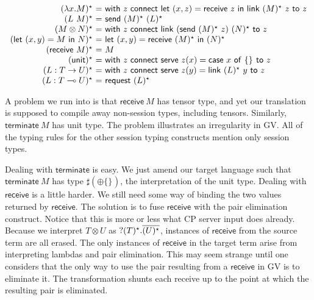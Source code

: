 \documentclass{easychair}
\makeatletter
\newcommand{\ba}{\begin{array}}
\newcommand{\ea}{\end{array}}
\newenvironment{equations}{\[\ba{@{}r@{~}c@{~}l@{}}}{\ea\]}
\newcommand{\key}{\mathsf}
\newcommand{\set}[1]{\{ #1 \}}
\newcommand{\row}[2]{\set{#1}_{#2}}
\newcommand{\gvInput}[2]{\mathord{?}{#1}.{#2}}
\newcommand{\gvPlus}[2]{\oplus \row{#1}{#2}}
\newcommand{\gvService}[1]{\sharp {#1}}
\newcommand{\gvDual}[1]{\overline{#1}}
\newcommand{\lolli}{\multimap}
\newcommand{\gvLinFun}[2]{{#1} \lolli {#2}}
\newcommand{\gvUnFun}[2]{{#1} \to {#2}}
\newcommand{\gvTimes}[2]{{#1} \otimes {#2}}
\newcommand{\gvUnit}{\key{unit}}
\newcommand{\gvLink}[2]{\key{link}~{#1}~{#2}}
\newcommand{\gvLam}[2]{\lambda {#1}.{#2}}
\newcommand{\gvApp}[2]{{#1}~{#2}}
\newcommand{\gvPair}[2]{({#1},{#2})}
\newcommand{\gvLet}[3]{\key{let}~{#1}={#2}~\key{in}~{#3}}
\newcommand{\gvSend}[2]{\key{send}~{#1}~{#2}}
\newcommand{\gvReceive}[1]{\key{receive}~{#1}}
\newcommand{\gvCase}[2]{\key{case}~{#1}~\key{of}~{#2}}
\newcommand{\gvWith}[3]{\key{with}~{#1}~\key{connect}~{#2}~\key{to}~{#3}}
\newcommand{\gvTerminate}[1]{\key{terminate}~{#1}}
\newcommand{\gvServeOld}[3]{\key{serve}~{#1}({#2})={#3}}
\newcommand{\gvRequest}[1]{\key{request}~{#1}}
\makeatother
\begin{document}
\begin{equations}
\gvtogv{\gvLam{x}{M}} &=& \gvWith{z}{\gvLet{\gvPair{x}{z}}{\gvReceive{z}}{\gvLink{\gvtogv{M}}{z}}}{z} \\
\gvtogv{\gvApp{L}{M}} &=& \gvSend{\gvtogv{M}}{\gvtogv{L}} \\
\gvtogv{\gvTimes{M}{N}} &=&
  \gvWith{z}
    {\gvLink{(\gvSend{\gvtogv{M}}{z})}{\gvtogv{N}}}
    {z} \\
\gvtogv{\gvLet{\gvPair{x}{y}}{M}{N}} &=&
    \gvLet{\gvPair{x}{y}}{\gvReceive{\gvtogv{M}}}{\gvtogv{N}} \\
\gvtogv{\gvReceive{M}} &=& M \\
\gvtogv{\gvUnit} &=&
    \gvWith{z}
    {\gvServeOld{z}{x}{\gvCase{x}{\row{}{}}}}
    {z} \\
\gvtogv{L : \gvUnFun{T}{U}} &=&
  \gvWith{z}{\gvServeOld{z}{y}{\gvLink{\gvtogv{L}}{y}}}{z} \\
\gvtogv{L : \gvLinFun{T}{U}} &=& \gvRequest{\gvtogv{L}} \\
\end{equations}

A problem we run into is that $\gvReceive{M}$ has tensor type, and yet
our translation is supposed to compile away non-session types,
including tensors. Similarly, $\gvTerminate{M}$ has unit type. The
problem illustrates an irregularity in GV. All of the typing rules for
the other session typing constructs mention only session types.

Dealing with $\key{terminate}$ is easy. We just amend our target
language such that $\gvTerminate{M}$ has type
$\gvService{(\gvPlus{}{})}$, the interpretation of the unit type.
%
Dealing with $\key{receive}$ is a little harder. We still need some
way of binding the two values returned by $\key{receive}$. The
solution is to fuse $\key{receive}$ with the pair elimination
construct. Notice that this is more or less what CP server input does
already. Because we interpret $\gvTimes{T}{U}$ as
$\gvInput{\gvtogv{T}}{\gvDual{\gvtogv{U}}}$, instances of
$\key{receive}$ from the source term are all erased. The only
instances of $\key{receive}$ in the target term arise from
interpreting lambdas and pair elimination. This may seem strange until
one considers that the only way to use the pair resulting from a
$\key{receive}$ in GV is to eliminate it. The transformation shunts
each receive up to the point at which the resulting pair is
eliminated.
\end{document}
